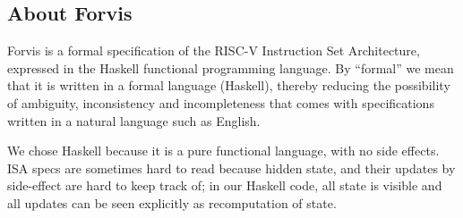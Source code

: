 \documentclass[11pt]{article}
\begin{document}

\subsection{About Forvis}

Forvis is a formal specification of the RISC-V Instruction Set
Architecture, expressed in the Haskell functional programming
language.  By ``formal'' we mean that it is written in a formal
language (Haskell), thereby reducing the possibility of ambiguity,
inconsistency and incompleteness that comes with specifications
written in a natural language such as English.

We chose Haskell because it is a pure functional language, with no
side effects.  ISA specs are sometimes hard to read because hidden
state, and their updates by side-effect are hard to keep track of; in
our Haskell code, all state is visible and all updates can be seen
explicitly as recomputation of state.
\end{document}
